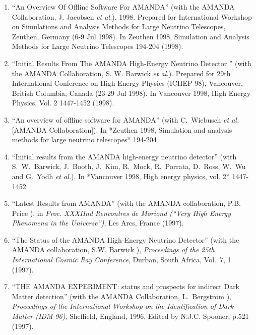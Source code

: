 \begin{enumerate}
\item ``An Overview Of Offline Software For AMANDA'' (with
        the AMANDA   Collaboration, J. Jacobsen {\it et
        al.}). 1998.  Prepared for   International Workshop
        on Simulations and Analysis Methods for Large
        Neutrino Telescopes, Zeuthen, Germany (6-9 Jul
        1998). In Zeuthen   1998, Simulation and Analysis
        Methods for Large Neutrino Telescopes   194-204
        (1998).

\item ``Initial Results From The AMANDA High-Energy Neutrino
        Detector  '' (with the AMANDA Collaboration, S. W.
        Barwick {\it et al.}).   Prepared for 29th
        International Conference on High-Energy Physics
        (ICHEP 98), Vancouver, British Columbia, Canada
        (23-29 Jul 1998). In   Vancouver 1998, High Energy
        Physics, Vol. 2 1447-1452 (1998).

\item ``An overview of offline software for AMANDA'' (with
        C.~Wiebusch {\it et al.} [AMANDA Collaboration]). In
        *Zeuthen 1998, Simulation and analysis methods for
        large neutrino telescopes* 194-204 %

\item ``Initial results from the AMANDA high-energy neutrino
        detector'' (with S.~W.~Barwick, J.~Booth, J.~Kim,
        R.~Mock, R.~Porrata, D.~Ross, W.~Wu and G.~Yodh {\it
        et al.}). In *Vancouver 1998, High energy physics,
        vol. 2* 1447-1452 %

\item ``Latest Results from AMANDA'' (with the AMANDA
        collaboration,   P.B. Price \etal), in {\it Proc.
        XXXIInd Rencontres de Moriond     (``Very High
        Energy Phenomena in the Universe'')}, Les Arcs,
        France (1997).

\item ``The Status of the AMANDA High-Energy Neutrino
        Detector'' (with the   AMANDA collaboration, S.W.
        Barwick \etal), {\it Proceedings of the     25th
        International Cosmic Ray Conference}, Durban, South
        Africa,   Vol.~7, 1 (1997).

\item ``THE AMANDA EXPERIMENT: status and prospects for
        indirect Dark   Matter detection'' (with the AMANDA
        Collaboration, L.~Bergstr\"{o}m   \etal), {\it
        Proceedings of the International Workshop on the
        Identification of Dark Matter (IDM 96)}, Sheffield,
        England, 1996,   Edited by N.J.C. Spooner, p.521
        (1997).


\end{enumerate}
